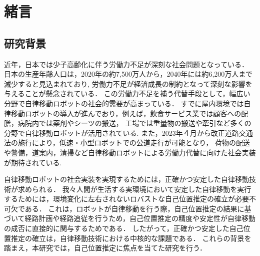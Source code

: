 \chapter{緒言}
\label{cha:introduction}
\graphicspath{{figures/01_introduction}}


\section{研究背景}
\label{sec:background}
近年，日本では少子高齢化に伴う労働力不足が深刻な社会問題となっている．
日本の生産年齢人口は，2020年の約7,500万人から，2040年には約6,200万人まで減少すると見込まれており\cite{WebCite_japan2025roudou},
労働力不足が経済成長の制約となって深刻な影響を与えることが懸念されている．
この労働力不足を補う代替手段として，幅広い分野で自律移動ロボットの社会的需要が高まっている．
すでに屋内環境では自律移動ロボットの導入が進んでおり，例えば，飲食サービス業では顧客への配膳，病院内では薬剤やシーツの搬送，
工場では重量物の搬送や牽引など多くの分野で自律移動ロボットが活用されている\cite{eatrobot,ando2022,maekawa2020}.
また，2023年４月から改正道路交通法の施行により，低速・小型ロボットでの公道走行が可能となり\cite{WebCite_japan2025robot}，
荷物の配送や警備，道案内，清掃など自律移動ロボットによる労働力代替に向けた社会実装が期待されている.

自律移動ロボットの社会実装を実現するためには，正確かつ安定した自律移動技術が求められる．
我々人間が生活する実環境において安定した自律移動を実行するためには，環境変化に左右されないロバストな自己位置推定の確立が必要不可欠である．
これは，ロボットが自律移動を行う際，自己位置推定の結果に基づいて経路計画や経路追従を行うため，自己位置推定の精度や安定性が自律移動の成否に直接的に関与するためである．
したがって，正確かつ安定した自己位置推定の確立は，自律移動技術における中核的な課題である．
これらの背景を踏まえ，本研究では，自己位置推定に焦点を当てた研究を行う．


